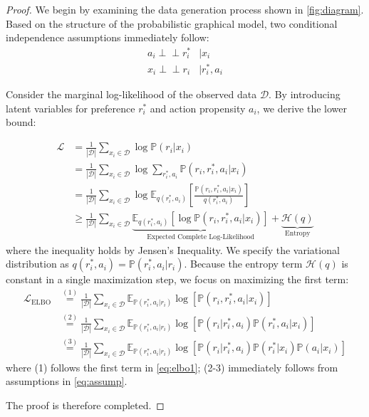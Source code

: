 \documentclass[]{arxiv_singlecolumn}
\theoremstyle{plain}
\theoremstyle{definition}
\theoremstyle{remark}
\begin{document}
\begin{proof}
We begin by examining the data generation process shown in \autoref{fig:diagram}. Based on the structure of the probabilistic graphical model, two conditional independence assumptions immediately follow:
\begin{equation}\label{eq:assump}
\begin{aligned}
    a_i \perp \!\!\! \perp r^*_i &\mid x_i\\
    x_i \perp \!\!\! \perp r_i &\mid r^*_i,a_i
\end{aligned}
\end{equation}

Consider the marginal log-likelihood of the observed data $\mathcal{D}$. By introducing latent variables for preference $r^*_i$ and action propensity $a_i$, we derive the lower bound:

\begin{equation}
\begin{aligned}
    \mathcal{L} &= \frac{1}{|\mathcal{D}|} \sum_{x_i\in\mathcal{D}} \log \mathbb{P}(r_i|x_i) \\
    &= \frac{1}{|\mathcal{D}|} \sum_{x_i\in\mathcal{D}} \log \sum_{r^*_i, a_i} \mathbb{P}(r_i, r^*_i, a_i|x_i) \\
    &= \frac{1}{|\mathcal{D}|} \sum_{x_i\in\mathcal{D}} \log \mathbb{E}_{q(r^*_i, a_i)} \left[ \frac{\mathbb{P}(r_i, r^*_i, a_i|x_i)}{q(r^*_i, a_i)} \right] \\
    &\geq \frac{1}{|\mathcal{D}|} \sum_{x_i\in\mathcal{D}} \underbrace{\mathbb{E}_{q(r^*_i, a_i)} \left[ \log \mathbb{P}(r_i, r^*_i, a_i|x_i) \right]}_{\text{Expected Complete Log-Likelihood}} + \underbrace{\mathcal{H}(q)}_{\text{Entropy}}
\end{aligned}
\end{equation}
where the inequality holds by Jensen's Inequality. We specify the variational distribution as $q(r^*_i, a_i) = \mathbb{P}(r^*_i, a_i|r_i)$. Because the entropy term $\mathcal{H}(q)$ is constant in a single maximization step, we focus on maximizing the first term:
\begin{equation}
\begin{aligned}\label{eq:elbo1}
    \mathcal{L}_\mathrm{ELBO}
    &\overset{(1)}{=}\frac{1}{|\mathcal{D}|} \sum_{x_i\in\mathcal{D}} \mathbb{E}_{\mathbb{P}(r^*_i,a_i|r_i)} \log\left[\mathbb{P}(r_i,r^*_i,a_i|x_i)\right]\\
    &\overset{(2)}{=}\frac{1}{|\mathcal{D}|} \sum_{x_i\in\mathcal{D}} \mathbb{E}_{\mathbb{P}(r^*_i,a_i|r_i)} \log\left[\mathbb{P}(r_i|r^*_i,a_i)\mathbb{P}(r^*_i,a_i|x_i)\right]\\
    &\overset{(3)}{=}\frac{1}{|\mathcal{D}|} \sum_{x_i\in\mathcal{D}} \mathbb{E}_{\mathbb{P}(r^*_i,a_i|r_i)} \log\left[\mathbb{P}(r_i|r^*_i,a_i)\mathbb{P}(r^*_i|x_i)\mathbb{P}(a_i|x_i)\right]
\end{aligned}
\end{equation}
where (1) follows the first term in \eqref{eq:elbo1}; (2-3) immediately follows from assumptions in \eqref{eq:assump}.

The proof is therefore completed. 

\end{proof}
\end{document}
